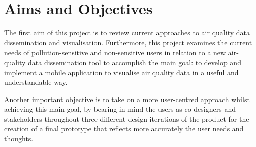 \section{Aims and Objectives}
The first aim of this project is to review current approaches to air quality data dissemination and visualisation. Furthermore, this project examines the current needs of pollution-sensitive and non-sensitive users in relation to a new air-quality data dissemination tool to accomplish the main goal: to develop and implement a mobile application to visualise air quality data in a useful and understandable way.

Another important objective is to take on a more user-centred approach whilst achieving this main goal, by bearing in mind the users as co-designers and stakeholders throughout three different design iterations of the product for the creation of a final prototype that reflects more accurately the user needs and thoughts.

\iffalse
DATA -> APP -> USEFUL -> PERSONAL -> DECISION SUPPORT -> DESIGNED BY PEOPLE
\fi